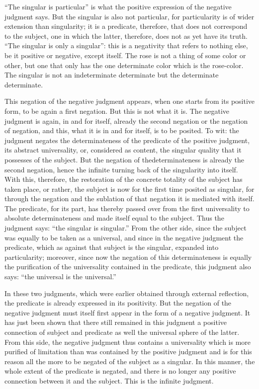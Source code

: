 “The singular is particular” is
what the positive expression of the negative judgment says.
But the singular is also not particular,
for particularity is of wider extension than singularity;
it is a predicate, therefore,
that does not correspond to the subject,
one in which the latter,
therefore, does not as yet have its truth.
“The singular is only a singular”:
this is a negativity that refers to nothing else,
be it positive or negative, except itself.
The rose is not a thing of some color or other,
but one that only has the one determinate color
which is the rose-color.
The singular is not an indeterminate determinate
but the determinate determinate.

This negation of the negative judgment appears,
when one starts from its positive form,
to be again a first negation.
But this is not what it is.
The negative judgment is again, in and for itself,
already the second negation or the negation of negation,
and this, what it is in and for itself, is to be posited.
To wit: the judgment negates the determinateness of the predicate
of the positive judgment, its abstract universality,
or, considered as content,
the singular quality that it possesses of the subject.
But the negation of thedeterminateness is
already the second negation,
hence the infinite turning back of
the singularity into itself.
With this, therefore, the restoration of
the concrete totality of the subject has taken place,
or rather, the subject is now for the first time
posited as singular,
for through the negation
and the sublation of that negation
it is mediated with itself.
The predicate, for its part, has thereby passed over
from the first universality to absolute determinateness
and made itself equal to the subject.
Thus the judgment says: “the singular is singular.”
From the other side, since the subject was
equally to be taken as a universal,
and since in the negative judgment the predicate,
which as against that subject is the singular,
expanded into particularity;
moreover, since now the negation
of this determinateness is equally
the purification of the universality
contained in the predicate,
this judgment also says:
“the universal is the universal.”

In these two judgments, which were
earlier obtained through external reflection,
the predicate is already expressed in its positivity.
But the negation of the negative judgment
must itself first appear in the form of a negative judgment.
It has just been shown that there still remained
in this judgment a positive connection of subject and predicate
as well the universal sphere of the latter.
From this side, the negative judgment
thus contains a universality
which is more purified of limitation
than was contained by the positive judgment
and is for this reason all the more
to be negated of the subject as a singular.
In this manner, the whole extent
of the predicate is negated,
and there is no longer any positive connection
between it and the subject.
This is the infinite judgment.

